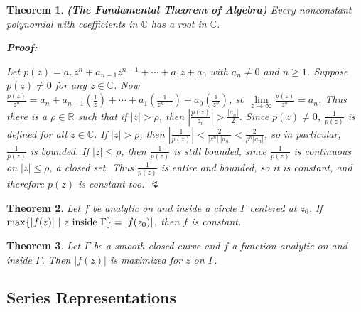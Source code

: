 \documentclass{article}
\theoremstyle{colontheorem}
\newtheorem{theorem}{Theorem}[section]
\newenvironment{Theorem}
{
	\begin{mdframed}[backgroundcolor=TheoremOrange!10]
	\begin{theorem}
}
{
	\end{theorem}
	\end{mdframed}
	
	\vspace{.15in}
}
\newenvironment{Proof}
{
	\begin{mdframed}[backgroundcolor=ProofPurple!10]
	\textbf{Proof:}%
}
{
	\end{mdframed}
	
	\vspace{.085in}
}
\begin{document}
\begin{Theorem}
	
	\textbf{(The Fundamental Theorem of Algebra)} Every nonconstant polynomial with coefficients in $\mathbb{C}$ has a root in $\mathbb{C}$.
	
	\begin{Proof}
		Let $p(z) = a_n z^n + a_{n-1} z^{n-1} + \cdots + a_1 z + a_0$ with $a_n \neq 0$ and $n \geq 1$. Suppose $p(z) \neq 0$ for any $z \in \mathbb{C}$. Now $\frac{p(z)}{z^n} = a_n + a_{n-1} \left( \frac{1}{z} \right) + \cdots + a_1 \left( \frac{1}{z^{n-1}} \right) + a_0 \left( \frac{1}{z^n} \right)$, so $\lim\limits_{z \to \infty} \frac{p(z)}{z^n} = a_n$. Thus there is a $\rho \in \mathbb{R}$ such that if $|z| > \rho$, then $\left| \frac{p(z)}{z_n} \right| > \frac{|a_n|}{2}$. Since $p(z) \neq 0$, $\frac{1}{p(z)}$ is defined for all $z \in \mathbb{C}$. If $|z| > \rho$, then $\left| \frac{1}{p(z)} \right| < \frac{2}{|z^n|\ |a_n|} < \frac{2}{\rho^n |a_n|}$, so in particular, $\frac{1}{p(z)}$ is bounded. If $|z| \leq \rho$, then $\frac{1}{p(z)}$ is still bounded, since $\frac{1}{p(z)}$ is continuous on $|z| \leq \rho$, a closed set. Thus $\frac{1}{p(z)}$ is entire and bounded, so it is constant, and therefore $p(z)$ is constant too. $\lightning$
		
	\end{Proof}
	
\end{Theorem}



\begin{Theorem}
	
	Let $f$ be analytic on and inside a circle $\Gamma$ centered at $z_0$. If $\max \{ |f(z)|\ |\ z \textnormal{ inside } \Gamma \} = |f(z_0)|$, then $f$ is constant.
	
\end{Theorem}



\begin{Theorem}
	
	Let $\Gamma$ be a smooth closed curve and $f$ a function analytic on and inside $\Gamma$. Then $|f(z)|$ is maximized for $z$ on $\Gamma$.
	
\end{Theorem}





\begin{center}
	\pagebreak
	
	\section{Series Representations}
	
	\vspace{.1in}
\end{center}
\end{document}
